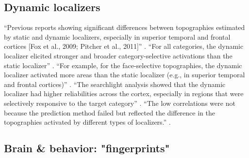 \subsection{Dynamic localizers}
%
``Previous reports showing significant differences between topographies
estimated by static and dynamic localizers, especially in superior temporal and
frontal cortices [Fox et al., 2009; Pitcher et al., 2011]''
\citep{jiahui2022cross}.
%
``For all categories, the dynamic localizer elicited stronger and broader
category-selective activations than the static localizer''
\citep{jiahui2022cross}.
%
``For example, for the face-selective topographies, the dynamic localizer
activated more areas than the static localizer (e.g., in superior temporal and
frontal cortices)'' \citep{jiahui2022cross}.
%
``The searchlight analysis showed that the dynamic localizer had higher
reliabilities across the cortex, especially in regions that were selectively
responsive to the target category'' \citep{jiahui2022cross}.
%
``The low correlations were not because the prediction method failed but
reflected the difference in the topographies activated by different types of
localizers.'' \citep{jiahui2022cross}.


\subsection{Brain \& behavior: "fingerprints"}

